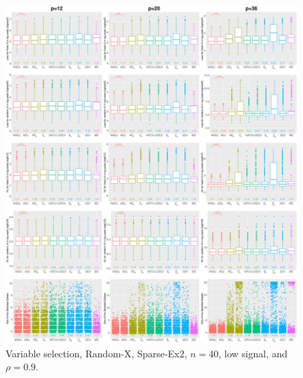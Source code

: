 \begin{figure}[!ht]
\centering
\includegraphics[width=\textwidth]{figures/supplement/randomx/subset_selection/Sparse-Ex2_n40_lsnr_rho09.eps}
\caption{Variable selection, Random-X, Sparse-Ex2, $n=40$, low signal, and $\rho=0.9$.}
\end{figure}
\clearpage
